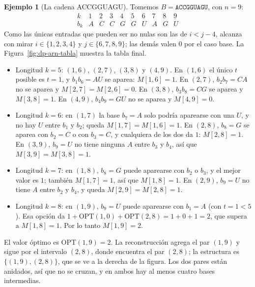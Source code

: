 \documentclass[12pt, spanish, oneside, openany]{book}
\theoremstyle{uprightplain}
\theoremstyle{definition}
\newtheorem{ejemplo}[teorema]{Ejemplo}
\theoremstyle{remark}
\theoremstyle{definition}
\newcommand{\OPT}{\mathrm{OPT}} %
\begin{document}
\begin{ejemplo}[La cadena ACCGGUAGU]
\label{ej:dp-arn}
Tomemos $B=\texttt{ACCGGUAGU}$, con $n=9$:
\[
\begin{array}{c|ccccccccc}
k & 1 & 2 & 3 & 4 & 5 & 6 & 7 & 8 & 9\\\hline
b_k & A & C & C & G & G & U & A & G & U
\end{array}
\]
Como las únicas entradas que pueden ser no nulas son las de $i<j-4$, alcanza con mirar $i\in\{1,2,3,4\}$ y $j\in\{6,7,8,9\}$; las demás valen $0$ por el caso base. La Figura~\ref{fig:dp-arn-tabla} muestra la tabla final.
\begin{itemize}
    \item Longitud $k=5$: $(1,6)$, $(2,7)$, $(3,8)$ y $(4,9)$. En $(1,6)$ el único $t$ posible es $t=1$, y $b_1b_6=AU$ se aparea: $M[1,6]=1$. En $(2,7)$, $b_2b_7=CA$ no se aparea y $M[2,7]=M[2,6]=0$. En $(3,8)$, $b_3b_8=CG$ se aparea y $M[3,8]=1$. En $(4,9)$, $b_4b_9=GU$ no se aparea y $M[4,9]=0$.
    \item Longitud $k=6$: en $(1,7)$ la base $b_7=A$ solo podría aparearse con una $U$, y no hay $U$ entre $b_1$ y $b_2$; queda $M[1,7]=M[1,6]=1$. En $(2,8)$, $b_8=G$ se aparea con $b_2=C$ o con $b_3=C$, y cualquiera de los dos da $1$: $M[2,8]=1$. En $(3,9)$, $b_9=U$ no tiene ninguna $A$ entre $b_3$ y $b_4$, así que $M[3,9]=M[3,8]=1$.
    \item Longitud $k=7$: en $(1,8)$, $b_8=G$ puede aparearse con $b_2$ o $b_3$, y el mejor valor es $1$; también $M[1,7]=1$, así que $M[1,8]=1$. En $(2,9)$, $b_9=U$ no tiene $A$ entre $b_2$ y $b_4$, y queda $M[2,9]=M[2,8]=1$.
    \item Longitud $k=8$: en $(1,9)$, $b_9=U$ puede aparearse con $b_1=A$ (con $t=1<5$). Esa opción da $1+\OPT(1,0)+\OPT(2,8)=1+0+1=2$, que supera a $M[1,8]=1$. Por lo tanto $M[1,9]=2$.
\end{itemize}
El valor óptimo es $\OPT(1,9)=2$. La reconstrucción agrega el par $(1,9)$ y sigue por el intervalo $(2,8)$, donde encuentra el par $(2,8)$; la estructura es $\{(1,9),(2,8)\}$, que se ve a la derecha de la figura. Los dos pares están anidados, así que no se cruzan, y en ambos hay al menos cuatro bases intermedias.
\end{ejemplo}
\end{document}
